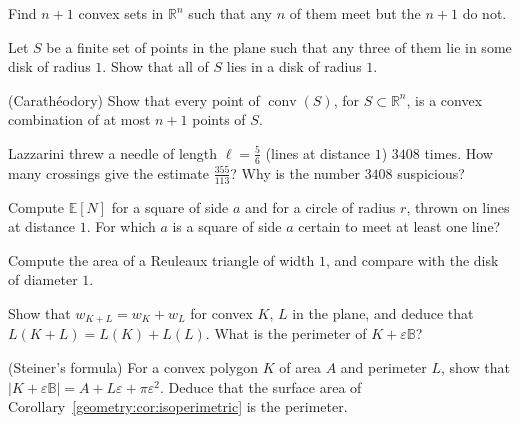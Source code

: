 \begin{exercise}[$\star$]\label{geometry:ex:hellysharp}
Find $n+1$ convex sets in $\mathbb R^n$ such that any $n$ of them meet but the $n+1$ do not.
\end{exercise}

\begin{exercise}[$\star\star$]\label{geometry:ex:hellydisk}
Let $S$ be a finite set of points in the plane such that any three of them lie in some disk of radius $1$. Show that all of $S$ lies in a disk of radius $1$.
\end{exercise}

\begin{exercise}[$\star\star$]\label{geometry:ex:caratheodory}
(Carath\'eodory) Show that every point of $\operatorname{conv}(S)$, for $S\subset\mathbb R^n$, is a convex combination of at most $n+1$ points of $S$.
\end{exercise}

\begin{exercise}[$\star$]\label{geometry:ex:lazzarini}
Lazzarini threw a needle of length $\ell=\frac56$ (lines at distance $1$) $3408$ times. How many crossings give the estimate $\frac{355}{113}$? Why is the number
$3408$ suspicious?
\end{exercise}

\begin{exercise}[$\star$]\label{geometry:ex:noodle}
Compute $\mathbb E[N]$ for a square of side $a$ and for a circle of radius $r$, thrown on lines at distance $1$. For which $a$ is a square of side $a$ certain to meet
at least one line?
\end{exercise}

\begin{exercise}[$\star$]\label{geometry:ex:reuleauxarea}
Compute the area of a Reuleaux triangle of width $1$, and compare with the disk of diameter $1$.
\end{exercise}

\begin{exercise}[$\star\star$]\label{geometry:ex:minkowskiwidth}
Show that $w_{K+L}=w_K+w_L$ for convex $K$, $L$ in the plane, and deduce that $L(K+L)=L(K)+L(L)$. What is the perimeter of $K+\varepsilon\mathbb B$?
\end{exercise}

\begin{exercise}[$\star\star$]\label{geometry:ex:steiner}
(Steiner's formula) For a convex polygon $K$ of area $A$ and perimeter $L$, show that $|K+\varepsilon\mathbb B|=A+L\varepsilon+\pi\varepsilon^2$. Deduce that the surface
area of Corollary~\ref{geometry:cor:isoperimetric} is the perimeter.
\end{exercise}

